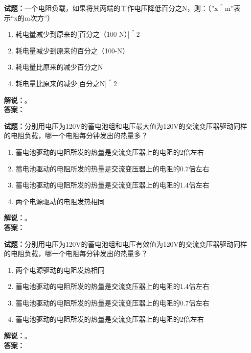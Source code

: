 \documentclass{ctexbook}
\begin{document}
\bigskip




\noindent\textbf{试题：}一个电阻负载，如果将其两端的工作电压降低百分之N，则：（”x＾m”表示“x的m次方”）
\begin{enumerate}[leftmargin=3em]
\item 耗电量减少到原来的[百分之（100-N）]＾2
\item 耗电量减少到原来的百分之（100-N）
\item 耗电量比原来的减少百分之N
\item 耗电量比原来的减少[百分之N]＾2
\end{enumerate}
\noindent\textbf{解说：}\textbf{}。\\\noindent\textbf{答案：}

\bigskip




\noindent\textbf{试题：}分别用电压为120V的蓄电池组和电压最大值为120V的交流变压器驱动同样的电阻负载，哪一个电阻每分钟发出的热量多？
\begin{enumerate}[leftmargin=3em]
\item 蓄电池驱动的电阻所发的热量是交流变压器上的电阻的2倍左右
\item 蓄电池驱动的电阻所发的热量是交流变压器上的电阻的0.7倍左右
\item 蓄电池驱动的电阻所发的热量是交流变压器上的电阻的1.4倍左右
\item 两个电源驱动的电阻发热相同
\end{enumerate}
\noindent\textbf{解说：}\textbf{}。\\\noindent\textbf{答案：}

\bigskip




\noindent\textbf{试题：}分别用电压为120V的蓄电池组和电压有效值为120V的交流变压器驱动同样的电阻负载，哪一个电阻每分钟发出的热量多？
\begin{enumerate}[leftmargin=3em]
\item 两个电源驱动的电阻发热相同
\item 蓄电池驱动的电阻所发的热量是交流变压器上的电阻的1.4倍左右
\item 蓄电池驱动的电阻所发的热量是交流变压器上的电阻的0.7倍左右
\item 蓄电池驱动的电阻所发的热量是交流变压器上的电阻的2倍左右
\end{enumerate}
\noindent\textbf{解说：}\textbf{}。\\\noindent\textbf{答案：}

\bigskip
\end{document}
